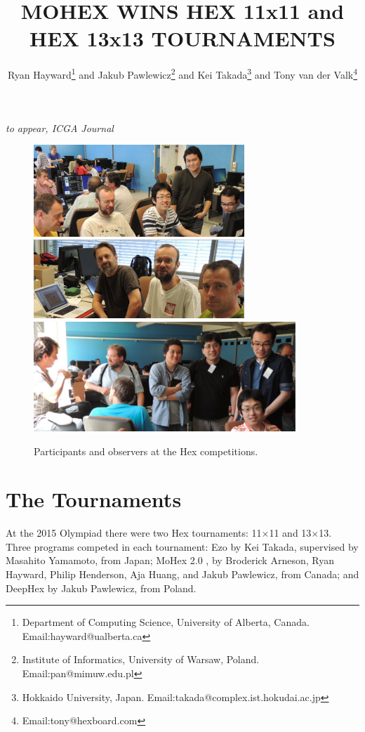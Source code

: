 \documentclass{icga}
\title{\sc MOHEX WINS HEX 11x11 and HEX 13x13 TOURNAMENTS}
\author{Ryan Hayward\thanks{Department 
of Computing Science, University of Alberta, Canada. Email:hayward@ualberta.ca} and
Jakub Pawlewicz\thanks{Institute of Informatics, University of Warsaw, Poland. Email:pan@mimuw.edu.pl} and
Kei Takada\thanks{Hokkaido University, Japan. Email:takada@complex.ist.hokudai.ac.jp} and
Tony van der Valk\thanks{Email:tony@hexboard.com}
}
\affiliation{Edmonton, Canada}
\def\Dx{\mbox{\sc DeepHex}}
\def\Eo{\mbox{\sc Ezo}}
\def\Mx{\mbox{\sc MoHex}}
\begin{document}
\maketitle

\vspace*{-2.25in}
{\it to appear, ICGA Journal}
\vspace*{2.0in}

\begin{figure}[hbt]
\includegraphics[width=225pt]{edo0.eps}\
\includegraphics[width=225pt]{rjt2.eps}\\

\hfill\includegraphics[width=280pt]{mas.eps}\hfill~
\caption{Participants and observers at the Hex competitions.}
\end{figure}


\section{The Tournaments}
At the 2015 Olympiad there were
two Hex tournaments: 11$\times$11 and 13$\times$13.
Three programs competed in each tournament:
\Eo{} 
by Kei Takada, supervised by Masahito Yamamoto, from Japan;
\Mx{} 2.0 , 
by Broderick Arneson, Ryan Hayward, Philip Henderson, Aja Huang, and Jakub Pawlewicz,
from Canada;
and
\Dx{}
by Jakub Pawlewicz, 
from Poland.
\end{document}
